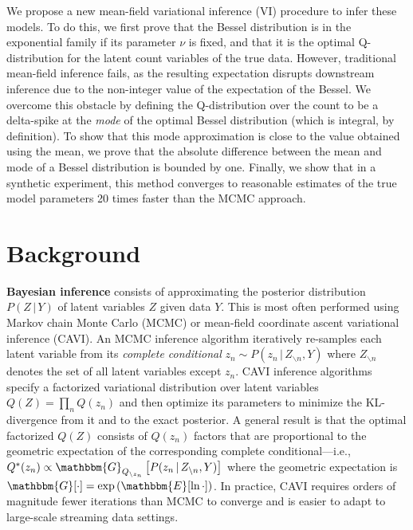 \documentclass[letterpaper]{article}
\newcommand{\Gqnot}[2]{\mathbbm{G}_{Q_{\backslash #1}}\left[#2\right]}
\begin{document}
  We propose a new mean-field variational inference (VI) procedure to infer
  these models. To do this, we first prove that the Bessel distribution is in
  the exponential family if its parameter $\nu$ is fixed, and that it is the
  optimal Q-distribution for the latent count variables of the true data.
  However, traditional mean-field inference fails, as the resulting expectation
  disrupts downstream inference due to the non-integer value of the expectation
  of the Bessel. We overcome this obstacle by defining the Q-distribution over
  the count to be a delta-spike at the \emph{mode} of the optimal Bessel
  distribution (which is integral, by definition). To show that this mode
  approximation is close to the value obtained using the mean, we prove that the
  absolute difference between the mean and mode of a Bessel distribution is
  bounded by one. Finally, we show that in a synthetic experiment, this method
  converges to reasonable estimates of the true model parameters 20 times faster
  than the MCMC approach.
  
  \section{Background}
  \textbf{Bayesian inference} consists of approximating the posterior
  distribution $P(Z\,|\,Y)$ of latent variables $Z$ given data $Y$. This is
  most often performed using Markov chain Monte Carlo (MCMC) or mean-field
  coordinate ascent variational inference (CAVI). An MCMC inference algorithm
  iteratively re-samples each latent variable from its \emph{complete
  conditional} $z_n \sim P(z_n\,|\,Z_{\backslash n}, Y)$ where $Z_{\backslash
  n}$ denotes the set of all latent variables except $z_n$. CAVI inference
  algorithms specify a factorized variational distribution over latent
  variables $Q(Z) = \prod_n Q(z_n)$ and then optimize its parameters to
  minimize the KL-divergence from it and to the exact posterior. A general
  result is that the optimal factorized $Q(Z)$ consists of $Q(z_n)$ factors
  that are proportional to the geometric expectation of the corresponding
  complete conditional---i.e., $Q^*(z_n) \propto
  \Gqnot{z_n}{P(z_n\,|\,Z_{\backslash n}, Y)}$ where the geometric expectation
  is $\mathbbm{G}[\cdot]=\exp\left(\mathbbm{E}[\ln \cdot]\right)$. In
  practice, CAVI requires orders of magnitude fewer iterations than MCMC to
  converge and is easier to adapt to large-scale streaming data settings.
  
\end{document}
